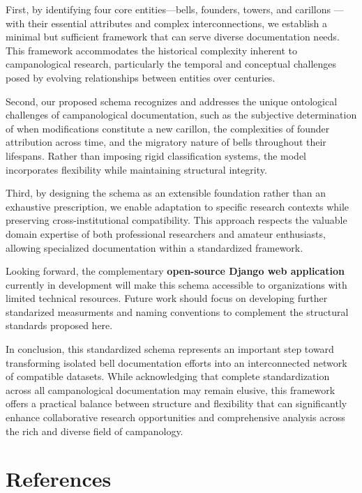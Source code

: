 \documentclass[11pt, a4paper]{article}
\begin{document}
First, by identifying four core entities—bells, founders, towers, and carillons — with their essential attributes and complex interconnections, we establish a minimal but sufficient framework that can serve diverse documentation needs. This framework accommodates the historical complexity inherent to campanological research, particularly the temporal and conceptual challenges posed by evolving relationships between entities over centuries.

Second, our proposed schema recognizes and addresses the unique ontological challenges of campanological documentation, such as the subjective determination of when modifications constitute a new carillon, the complexities of founder attribution across time, and the migratory nature of bells throughout their lifespans. Rather than imposing rigid classification systems, the model incorporates flexibility while maintaining structural integrity.

Third, by designing the schema as an extensible foundation rather than an exhaustive prescription, we enable adaptation to specific research contexts while preserving cross-institutional compatibility. This approach respects the valuable domain expertise of both professional researchers and amateur enthusiasts, allowing specialized documentation within a standardized framework.

Looking forward, the complementary \textbf{open-source Django web application} currently in development will make this schema accessible to organizations with limited technical resources. Future work should focus on developing further standarized measurments and naming conventions to complement the structural standards proposed here. 

In conclusion, this standardized schema represents an important step toward transforming isolated bell documentation efforts into an interconnected network of compatible datasets. While acknowledging that complete standardization across all campanological documentation may remain elusive, this framework offers a practical balance between structure and flexibility that can significantly enhance collaborative research opportunities and comprehensive analysis across the rich and diverse field of campanology.

\section{References}



\end{document}
